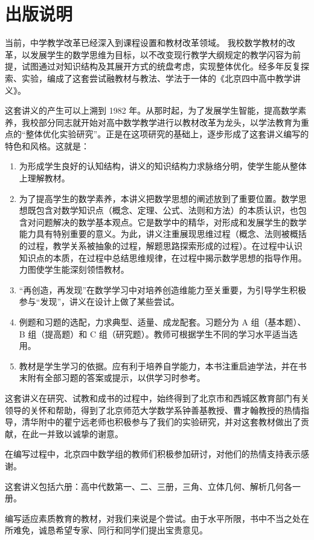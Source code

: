 \chapter{出版说明}

当前，中学教学改革已经深入到课程设置和教材改革领域。
我校数学教材的改革，以发展学生的数学思维为目标，以不改变现行教学大纲规定的教学闪容为前提，试图通过对知识结构及其展开方式的统盘考虑，实现整体优化。经多年反复探索、实验，编成了这套尝试融教材与教法、学法于一体的《北京四中高中教学讲义》。

这套讲义的产生可以上溯到 1982 年。从那时起，为了发展学生智能，提高数学素养，我校部分同志就开始对高中数学教学进行以教材改革为龙头，以学法教育为重点的“整体优化实验研究”。正是在这项研究的基础上，逐步形成了这套讲义编写的特色和风格。这就是：
\begin{enumerate}
    \item 为形成学生良好的认知结构，讲义的知识结构力求脉络分明，使学生能从整体上理解教材。
    \item 为了提高学生的数学素养，本讲义把数学思想的阐述放到了重要位置。数学思想既包含对数学知识点（概念、定理、公式、法则和方法）的本质认识，也包含对问题解决的数学基本观点。它是数学中的精华，对形成和发展学生的数学能力具有特别重要的意义。为此，讲义注重展现思维过程（概念、法则被概括的过程，教学关系被抽象的过程，解题思路探索形成的过程）。在过程中认识知识点的本质，在过程中总结思维规律，在过程中揭示数学思想的指导作用。力图使学生能深刻领悟教材。
    \item “再创造，再发现”在数学学习中对培养创造维能力至关重要，为引导学生积极参与“发现”，讲义在设计上做了某些尝试。
    \item 例题和习题的选配，力求典型、适量、成龙配套。习题分为 A 组（基本题）、 B 组（提高题）和 C 组（研究题）。教师可根据学生不同的学习水平适当选用。
    \item 教材是学生学习的依据。应有利于培养自学能力，本书注重启迪学法，并在书末附有全部习题的答案或提示，以供学习时参考。
 \end{enumerate}   

这套讲义在研究、试教和成书的过程中，始终得到了北京市和西城区教育部门有关领导的关怀和帮助，得到了北京师范大学数学系钟善基教授、曹才翰教授的热情指导，清华附中的瞿宁远老师也积极参与了我们的实验研究，并对这套教材做出了贡献，在此一并致以诚挚的谢意。

在编写过程中，北京四中数学组的教师们积极参加研讨，对他们的热情支持表示感谢。

这套讲义包括六册：高中代数第一、二、三册，三角、立体几何、解析几何各一册。

编写适应素质教育的教材，对我们来说是个尝试。由于水平所限，书中不当之处在所难免，诚恳希望专家、同行和同学们提出宝贵意见。

